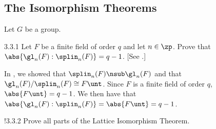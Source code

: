 \subsection{The Isomorphism Theorems}

Let $G$ be a group.

\begin{exercise}{3.3.1}
    Let $F$ be a finite field of order $q$ and let $n \in \zp$.
	Prove that $\abs{\gl_n(F) : \splin_n(F)} = q - 1$. [See .]
\end{exercise}

\begin{sol}
    In , we showed that $\splin_n(F) \nsub \gl_n(F)$ and that $\gl_n(F)/\splin_n(F) \cong F\unt$.
	Since $F$ is a finite field of order $q$, $\abs{F\unt} = q - 1$.
	We then have that $\abs{\gl_n(F) : \splin_n(F)} = \abs{F\unt} = q - 1$.
\end{sol}

\begin{exercise}!{3.3.2}
    Prove all parts of the Lattice Isomorphism Theorem.
\end{exercise}

